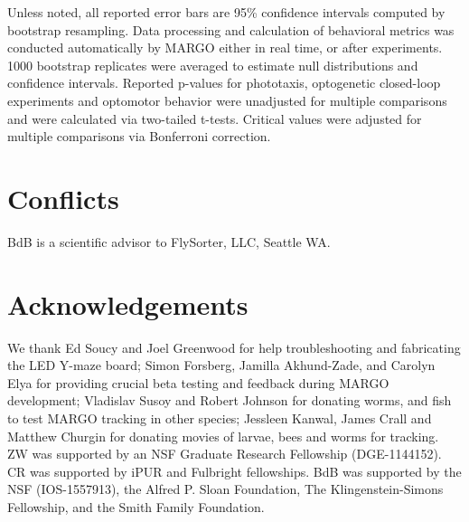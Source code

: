 \documentclass[10pt]{article}
\begin{document}
\begin{multicols}{2}
Unless noted, all reported error bars are 95\% confidence intervals computed by bootstrap resampling. Data processing and calculation of behavioral metrics was conducted automatically by MARGO either in real time, or after experiments. 1000 bootstrap replicates were averaged to estimate null distributions and confidence intervals. Reported p-values for phototaxis, optogenetic closed-loop experiments and optomotor behavior were unadjusted for multiple comparisons and were calculated via two-tailed t-tests. Critical values were adjusted for multiple comparisons via Bonferroni correction.

\section*{Conflicts}

BdB is a scientific advisor to FlySorter, LLC, Seattle WA.

\section*{Acknowledgements}

We thank Ed Soucy and Joel Greenwood for help troubleshooting and fabricating the LED Y-maze board; Simon Forsberg, Jamilla Akhund-Zade, and Carolyn Elya for providing crucial beta testing and feedback during MARGO development; Vladislav Susoy and Robert Johnson for donating worms, and fish to test MARGO tracking in other species; Jessleen Kanwal, James Crall and Matthew Churgin for donating movies of larvae, bees and worms for tracking. ZW was supported by an NSF Graduate Research Fellowship (DGE-1144152). CR was supported by iPUR and Fulbright fellowships. BdB was supported by the NSF (IOS-1557913), the Alfred P. Sloan Foundation, The Klingenstein-Simons Fellowship, and the Smith Family Foundation. 

 
\end{multicols}
\end{document}
